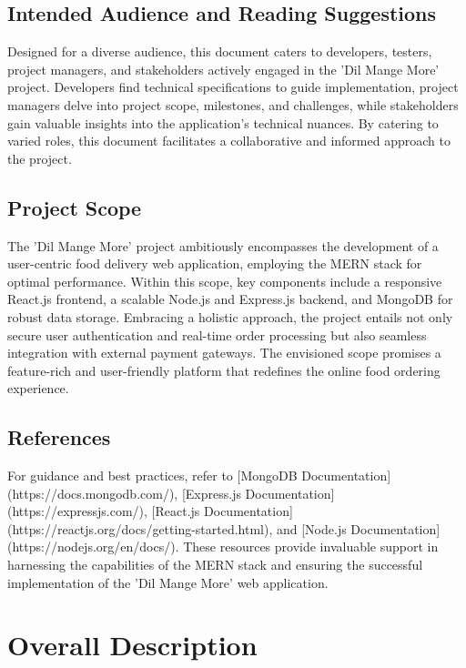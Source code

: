 \documentclass{article}
\begin{document}
\subsection{Intended Audience and Reading Suggestions}
Designed for a diverse audience, this document caters to developers, testers, project managers, and stakeholders actively engaged in the 'Dil Mange More' project. Developers find technical specifications to guide implementation, project managers delve into project scope, milestones, and challenges, while stakeholders gain valuable insights into the application's technical nuances. By catering to varied roles, this document facilitates a collaborative and informed approach to the project.

\subsection{Project Scope}
The 'Dil Mange More' project ambitiously encompasses the development of a user-centric food delivery web application, employing the MERN stack for optimal performance. Within this scope, key components include a responsive React.js frontend, a scalable Node.js and Express.js backend, and MongoDB for robust data storage. Embracing a holistic approach, the project entails not only secure user authentication and real-time order processing but also seamless integration with external payment gateways. The envisioned scope promises a feature-rich and user-friendly platform that redefines the online food ordering experience.

\subsection{References}
For guidance and best practices, refer to [MongoDB Documentation](https://docs.mongodb.com/), [Express.js Documentation](https://expressjs.com/), [React.js Documentation](https://reactjs.org/docs/getting-started.html), and [Node.js Documentation](https://nodejs.org/en/docs/). These resources provide invaluable support in harnessing the capabilities of the MERN stack and ensuring the successful implementation of the 'Dil Mange More' web application.

\newpage
\section{Overall Description}
\end{document}
